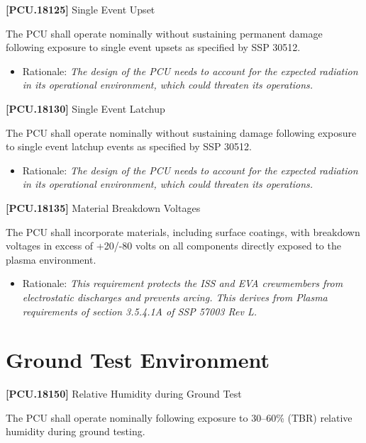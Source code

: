 \documentclass[12pt,oneside,oldfontcommands]{memoir}
\begin{document}
\textbf{[PCU.18125]} Single Event Upset

The \gls{PCU} shall operate nominally without sustaining permanent damage following exposure to single event upsets as specified by SSP 30512.

\begin{itemize}
\item{} Rationale: \emph{The design of the PCU needs to account for the expected radiation in its operational environment, which could threaten its operations.}

\end{itemize}

\textbf{[PCU.18130]} Single Event Latchup

The \gls{PCU} shall operate nominally without sustaining damage following exposure to single event latchup events as specified by SSP 30512.

\begin{itemize}
\item{} Rationale: \emph{The design of the PCU needs to account for the expected radiation in its operational environment, which could threaten its operations.}

\end{itemize}

\textbf{[PCU.18135]} Material Breakdown Voltages

The \gls{PCU} shall incorporate materials, including surface coatings, with breakdown voltages in excess of +20\slash -80 volts on all components directly exposed to the plasma environment.

\begin{itemize}
\item{} Rationale: \emph{This requirement protects the ISS and EVA crewmembers from electrostatic discharges and prevents arcing. This derives from Plasma requirements of section 3.5.4.1A of SSP 57003 Rev L.}

\end{itemize}

\section{Ground Test Environment}
\label{groundtestenvironment}

\textbf{[PCU.18150]} Relative Humidity during Ground Test

The \gls{PCU} shall operate nominally following exposure to 30--60\% (TBR\label{tbx_21}) relative humidity during ground testing.
\end{document}
